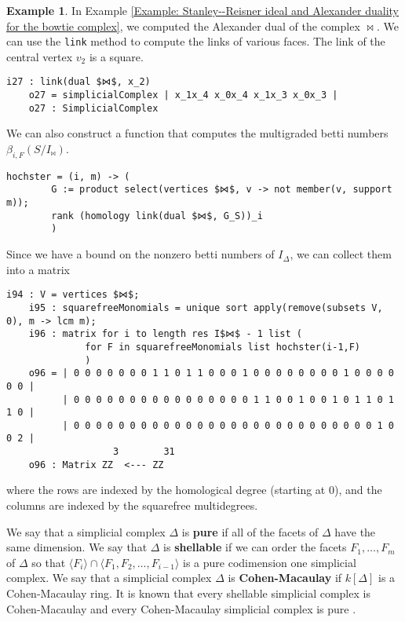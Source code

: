 \documentclass[12pt,leqno]{amsart}
\theoremstyle{definition}
\newtheorem{example}[lemma]{Example}
\begin{document}
\begin{example}
  In Example \ref{Example: Stanley--Reisner ideal and Alexander duality for
    the bowtie complex}, we computed the Alexander dual of the complex
  $\bowtie$. We can use the \texttt{link} method to compute the links of
  various faces. The link of the central vertex $v_2$ is a square.
\begin{lstlisting}[basicstyle={\ttfamily \scriptsize}, xleftmargin=-23pt]
    i27 : link(dual $⋈$, x_2)
    o27 = simplicialComplex | x_1x_4 x_0x_4 x_1x_3 x_0x_3 |
    o27 : SimplicialComplex
\end{lstlisting}
  We can also construct a function that computes the multigraded betti numbers $\beta_{i,F}(S/I_{\bowtie})$.
\begin{lstlisting}[basicstyle={\ttfamily \scriptsize}, xleftmargin=-23pt]
    hochster = (i, m) -> (
        G := product select(vertices $⋈$, v -> not member(v, support m));
        rank (homology link(dual $⋈$, G_S))_i
        )
\end{lstlisting}
  Since we have a bound on the nonzero betti numbers of $I_\Delta$, we can collect them into a matrix
\begin{lstlisting}[basicstyle={\ttfamily \scriptsize}, xleftmargin=-23pt]
    i94 : V = vertices $⋈$;
    i95 : squarefreeMonomials = unique sort apply(remove(subsets V, 0), m -> lcm m);
    i96 : matrix for i to length res I$⋈$ - 1 list (
              for F in squarefreeMonomials list hochster(i-1,F)
              )
    o96 = | 0 0 0 0 0 0 0 1 1 0 1 1 0 0 0 1 0 0 0 0 0 0 0 0 1 0 0 0 0 0 0 |
          | 0 0 0 0 0 0 0 0 0 0 0 0 0 0 0 0 1 1 0 0 1 0 0 1 0 1 1 0 1 1 0 |
          | 0 0 0 0 0 0 0 0 0 0 0 0 0 0 0 0 0 0 0 0 0 0 0 0 0 0 0 1 0 0 2 |
                   3        31
    o96 : Matrix ZZ  <--- ZZ
\end{lstlisting}
  where the rows are indexed by the homological degree (starting at $0$), and the columns are indexed by the squarefree multidegrees.
\end{example}
% 
We say that a simplicial complex $\Delta$ is \textbf{pure} if all of the
facets of $\Delta$ have the same dimension. We say that $\Delta$ is
\textbf{shellable} if we can order the facets $F_1,\dotsc,F_m$ of $\Delta$ so
that $\langle F_i \rangle \cap \langle F_1,F_2,\dotsc,F_{i-1} \rangle$ is a
pure codimension one simplicial complex. We say that a simplicial complex
$\Delta$ is \textbf{Cohen-Macaulay} if $k[\Delta]$ is a Cohen-Macaulay
ring. It is known that every shellable simplicial complex is Cohen-Macaulay
\cite[Theorem 5.1.13]{BH} and every Cohen-Macaulay simplicial complex is pure
\cite[Corollary 5.1.5]{BH}.
\end{document}
